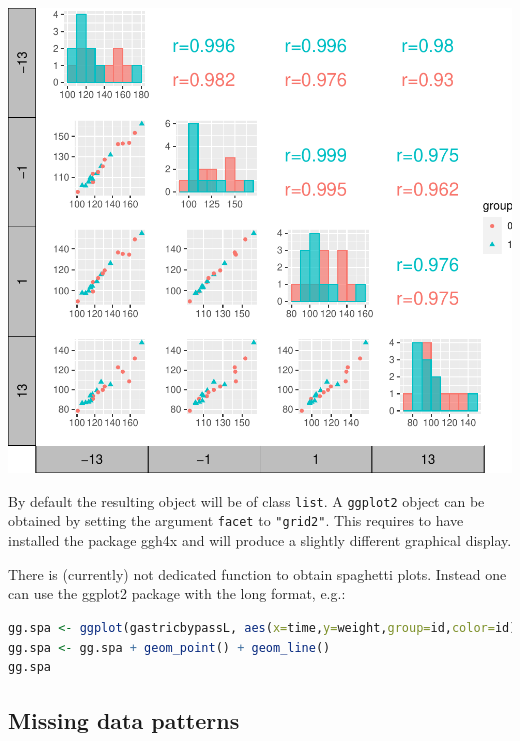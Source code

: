 \documentclass[12pt]{article}
\begin{document}
\begin{minipage}{0.48\linewidth}
\begin{center}
\includegraphics[trim={0 0 0 0},width=\textwidth]{./figures/scatterplot-group.pdf}
\end{center}
\end{minipage}


\bigskip

By default the resulting object will be of class \texttt{list}. A \texttt{ggplot2}
object can be obtained by setting the argument \texttt{facet} to
\texttt{"grid2"}. This requires to have installed the package ggh4x and will
produce a slightly different graphical display.

\bigskip

There is (currently) not dedicated function to obtain spaghetti
plots. Instead one can use the ggplot2 package with the long format, e.g.:
\begin{lstlisting}[language=r,numbers=none]
gg.spa <- ggplot(gastricbypassL, aes(x=time,y=weight,group=id,color=id))
gg.spa <- gg.spa + geom_point() + geom_line()
gg.spa
\end{lstlisting}

\clearpage
\subsection{Missing data patterns}
\label{sec:org15412d2}
\end{document}
